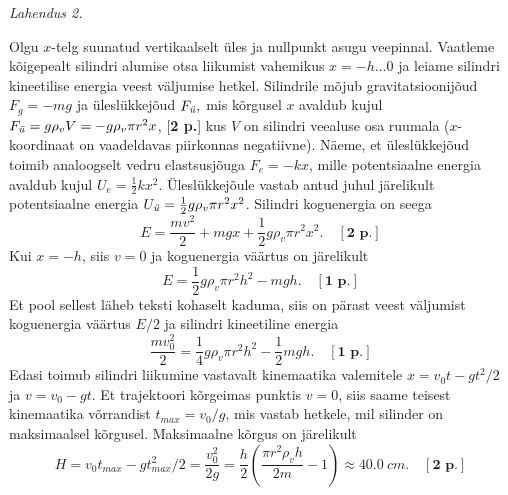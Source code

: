 \emph{Lahendus 2.}

Olgu $x$-telg suunatud vertikaalselt üles ja nullpunkt asugu veepinnal. Vaatleme kõige\-pealt silindri alumise otsa liikumist vahemikus $x=-h...0$ ja leiame silindri kineetilise energia veest väljumise hetkel. Silindrile mõjub
gravitatsioonijõud ${F_g=-mg}$ ja üleslükkejõud $F_\text{\emph{\"u}},$ mis kõrgusel $x$ avaldub kujul $F_\text{\emph{\"u}}=g\rho_vV=-g\rho_v \pi r^2 x$, [\textbf{2 p.}] kus $V$ on silindri veealuse osa ruumala ($x$-koordinaat on vaadeldavas piirkonnas negatiiv\-ne). Näeme, et üleslükkejõud toimib analoogselt vedru elastsusjõuga $F_e=-kx$, mille potentsiaalne energia avaldub kujul $U_e=\frac{1}{2}kx^2$. Üleslükkejõule vastab antud juhul järelikult potentsiaalne energia $U_\text{\emph{\"u}}=\frac{1}{2}g\rho_v \pi r^2 x^2$. Silindri koguenergia on seega
\[
	E=\frac{mv^2}{2}+mgx+\frac{1}{2}g\rho_v \pi r^2 x^2. \quad[\textbf{2 p.}]
\]
Kui $x=-h$, siis $v=0$ ja koguenergia väärtus on järelikult
\[
	E=\frac{1}{2}g\rho_v \pi r^2 h^2-mgh. \quad[\textbf{1 p.}]
\]
Et pool sellest läheb teksti kohaselt kaduma, siis on pärast veest väljumist koguenergia väärtus $E/2$ ja silindri kineetiline energia
\[
	\frac{mv_0^2}{2}=\frac{1}{4}g\rho_v \pi r^2 h^2-\frac{1}{2}mgh. \quad[\textbf{1 p.}]
\]
Edasi toimub silindri liikumine vastavalt kinemaatika valemitele $x=v_0t-gt^2/2$ ja $v=v_0-gt$. Et trajektoori kõrgeimas punktis $v=0$, siis saame teisest kinemaatika võrrandist $t_{max}=v_0/g$, mis vastab hetkele, mil silinder on maksimaalsel kõrgusel. Maksimaalne kõrgus on järelikult
\[
	H=v_0t_{max}-gt_{max}^2/2=\frac{v_0^2}{2g}=\frac{h}{2}\left(\frac{\pi r^2\rho_v h}{2m}-1\right)\approx \SI{40.0}{cm}. \quad[\textbf{2 p.}]
\]
\probend